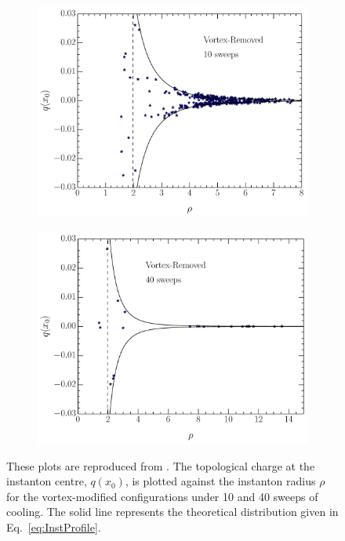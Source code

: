 \begin{figure}
\begin{subfigure}[]{0.5\textwidth}
\includegraphics[width=\columnwidth]{./VRcool10.pdf}
\end{subfigure}
\begin{subfigure}[]{0.5\textwidth}
\label{VRcool40}
\includegraphics[width=\columnwidth]{./VRcool40.pdf}
\end{subfigure}
\caption[The topological charge at the instanton centre plotted against the instanton radius for the cooled vortex-modified configurations.]{\label{fig:InstantonRadius} These plots are reproduced from \citet{Trewartha:2015ida}. The topological charge at the instanton centre, $q(x_0)$, is plotted against the instanton radius $\rho$ for the vortex-modified configurations under 10 and 40 sweeps of cooling. The solid line represents the theoretical distribution given in Eq.~\eqref{eq:InstProfile}. }
\end{figure}